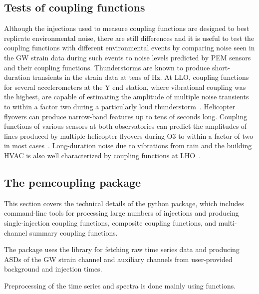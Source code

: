 \subsection{Tests of coupling functions}

Although the injections used to measure coupling functions are designed to best replicate environmental noise, there are still differences and it is useful to test the coupling functions with different environmental events by comparing noise seen in the \ac{GW} strain data during such events to noise levels predicted by PEM sensors and their coupling functions.
Thunderstorms are known to produce short-duration transients in the strain data at tens of Hz.
At \ac{LLO}, coupling functions for several accelerometers at the Y end station, where vibrational coupling was the highest, are capable of estimating the amplitude of multiple noise transients to within a factor two during a particularly loud thunderstorm~\cite{alog_thunder}.
Helicopter flyovers can produce narrow-band features up to tens of seconds long.
Coupling functions of various sensors at both observatories can predict the amplitudes of lines produced by multiple helicopter flyovers during O3 to within a factor of two in most cases~\cite{alog_helicopter}.
Long-duration noise due to vibrations from rain and the building \ac{HVAC} is also well characterized by coupling functions at \ac{LHO}~\cite{alog_rain, alog_hvac_coupling}.

\subsection{The {\selectfont pemcoupling}\xspace package}

This section covers the technical details of the \pemcoupling python package, which includes command-line tools for processing large numbers of injections and producing single-injection coupling functions, composite coupling functions, and multi-channel summary coupling functions.

The package uses the  library for fetching raw time series data and producing \acp{ASD} of the \ac{GW} strain channel and auxiliary channels from user-provided background and injection times.

Preprocessing of the time series and spectra is done mainly using  functions.

